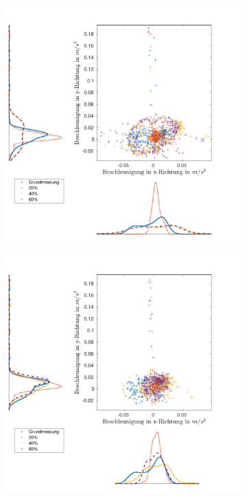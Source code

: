 \begin{figure}[tb]
	\centering
	\begin{adjustwidth}{-0.2\linewidth}{-0.2\linewidth}
	\hspace{5pt}
	\begin{subfigure}[c]{.45\linewidth}
		\centering
		\includegraphics[width=\linewidth]{Bilder/Beschleunigung_Grund_20_40_60_ohneM.pdf}
		\vspace{5pt}
	\end{subfigure}
	\hspace{20pt}
	\begin{subfigure}[c]{.45\linewidth}
		\centering
		\includegraphics[width=\linewidth]{Bilder/Beschleunigung_Grund_20_40_60_mitM.pdf}

\end{subfigure}
\end{adjustwidth}
\end{figure}
